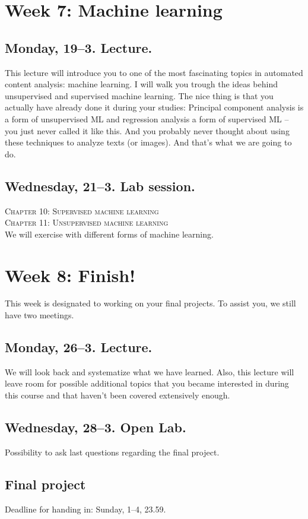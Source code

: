 \documentclass[a4paper,10pt]{report}
\begin{document}
\section*{Week 7: Machine learning}

\subsection*{Monday, 19--3. Lecture.}
This lecture will introduce you to one of the most fascinating topics in automated content analysis: machine learning. I will walk you trough the ideas behind unsupervised and supervised machine learning. The nice thing is that you actually have already done it during your studies: Principal component analysis is a form of unsupervised ML and regression analysis a form of supervised ML -- you just never called it like this. And you probably never thought about using these techniques to analyze texts (or images). And that's what we are going to do.

\subsection*{Wednesday, 21--3. Lab session.}
\textsc{ Chapter 10: Supervised machine learning}\\
\textsc{ Chapter 11: Unsupervised machine learning}\\
We will exercise with different forms of machine learning. 


\section*{Week 8: Finish!}
This week is designated to working on your final projects. To assist you, we still have two meetings.

\subsection*{Monday, 26--3. Lecture.}
We will look back and systematize what we have learned. Also, this lecture will leave room for possible additional topics that you became interested in during this course and that haven't been covered extensively enough. %


\subsection*{Wednesday, 28--3. Open Lab.}
Possibility to ask last questions regarding the final project.

\subsection*{Final project}
Deadline for handing in: Sunday, 1--4, 23.59.




 
 
 
\end{document}
